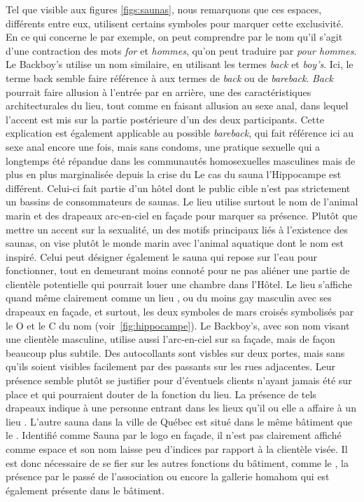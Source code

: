 Tel que visible aux figures \ref{figs:saunas}, nous remarquons que ces espaces, différents entre eux, utilisent certains symboles pour marquer cette exclusivité.
En ce qui concerne le  par exemple, on peut comprendre par le nom qu'il s'agit d'une contraction des mots \emph{for} et \emph{hommes}, qu'on peut traduire par \emph{pour hommes}.
Le Backboy's utilise un nom similaire, en utilisant les termes \emph{back} et \emph{boy's}.
Ici, le terme back semble faire référence à aux termes de \emph{back} ou de \emph{bareback}.
\emph{Back} pourrait faire allusion à l'entrée par en arrière, une des caractéristiques architecturales du lieu, tout comme en faisant allusion au sexe anal, dans lequel l'accent est mis sur la partie postérieure d'un des deux participants.
Cette explication est également applicable au possible \emph{bareback}, qui fait référence ici au sexe anal encore une fois, mais sans condoms, une pratique sexuelle qui a longtemps été répandue dans les communautés homosexuelles masculines mais de plus en plus marginalisée depuis la crise du \sida{}
Le cas du sauna l'Hippocampe est différent.
Celui-ci fait partie d'un hôtel dont le public cible n'est pas strictement un bassins de consommateurs de saunas.
Le lieu utilise surtout le nom de l'animal marin et des drapeaux arc-en-ciel en façade pour marquer sa présence.
Plutôt que mettre un accent sur la sexualité, un des motifs principaux liés à l'existence des saunas, on vise plutôt le monde marin avec l'animal aquatique dont le nom est inspiré.
Celui peut désigner également le sauna qui repose sur l'eau pour fonctionner, tout en demeurant moins connoté pour ne pas aliéner une partie de clientèle potentielle qui pourrait louer une chambre dans l'Hôtel.
Le lieu s'affiche quand même clairement comme un lieu \lgbt{}, ou du moins gay masculin avec ses drapeaux en façade, et surtout, les deux symboles de mars croisés symbolisés par le O et le C du nom (voir~\ref{fig:hippocampe}).
Le Backboy's, avec son nom visant une clientèle masculine, utilise aussi l'arc-en-ciel sur sa façade, mais de façon beaucoup plus subtile.
Des autocollants sont visbles sur deux portes, mais sans qu'ils soient visibles facilement par des passants sur les rues adjacentes.
Leur présence semble plutôt se justifier pour d'éventuels clients n'ayant jamais été sur place et qui pourraient douter de la fonction du lieu.
La présence de tels drapeaux indique à une personne entrant dans les lieux qu'il ou elle a affaire à un lieu \lgbt{}.
L'autre sauna dans la ville de Québec est situé dans le même bâtiment que le .
Identifié comme Sauna par le logo en façade, il n'est pas clairement affiché comme espace \lgbt{} et son nom laisse peu d'indices par rapport à la clientèle visée.
Il est donc nécessaire de se fier sur les autres fonctions du bâtiment, comme le , la présence par le passé de l'association  ou encore la gallerie homahom qui est également présente dans le bâtiment.

